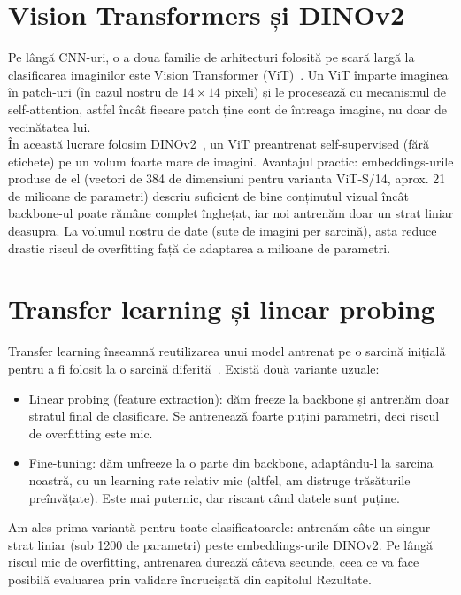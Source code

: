 \documentclass[12pt, a4paper, openany]{book}
\begin{document}
\section{Vision Transformers și DINOv2}
Pe lângă CNN-uri, o a doua familie de arhitecturi folosită pe scară largă la clasificarea imaginilor este Vision Transformer (ViT)~\cite{dosovitskiy2020vit}. Un ViT împarte imaginea în patch-uri (în cazul nostru de $14 \times 14$ pixeli) și le procesează cu mecanismul de self-attention, astfel încât fiecare patch ține cont de întreaga imagine, nu doar de vecinătatea lui.
\\ \indent În această lucrare folosim DINOv2~\cite{oquab2023dinov2}, un ViT preantrenat self-supervised (fără etichete) pe un volum foarte mare de imagini. Avantajul practic: embeddings-urile produse de el (vectori de 384 de dimensiuni pentru varianta ViT-S/14, aprox. 21 de milioane de parametri) descriu suficient de bine conținutul vizual încât backbone-ul poate rămâne complet înghețat, iar noi antrenăm doar un strat liniar deasupra. La volumul nostru de date (sute de imagini per sarcină), asta reduce drastic riscul de overfitting față de adaptarea a milioane de parametri.
\section{Transfer learning și linear probing}
Transfer learning înseamnă reutilizarea unui model antrenat pe o sarcină inițială pentru a fi folosit la o sarcină diferită~\cite{yosinski2014transferable}. Există două variante uzuale:

\begin{itemize}
\item Linear probing (feature extraction): dăm freeze la backbone și antrenăm doar stratul final de clasificare. Se antrenează foarte puțini parametri, deci riscul de overfitting este mic.
\item Fine-tuning: dăm unfreeze la o parte din backbone, adaptându-l la sarcina noastră, cu un learning rate relativ mic (altfel, am distruge trăsăturile preînvățate). Este mai puternic, dar riscant când datele sunt puține.
\end{itemize}

Am ales prima variantă pentru toate clasificatoarele: antrenăm câte un singur strat liniar (sub 1200 de parametri) peste embeddings-urile DINOv2. Pe lângă riscul mic de overfitting, antrenarea durează câteva secunde, ceea ce va face posibilă evaluarea prin validare încrucișată din capitolul Rezultate.
\end{document}
